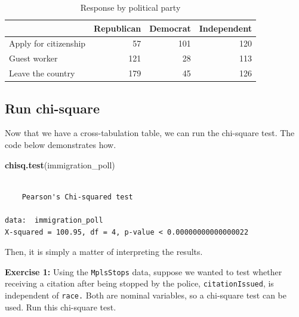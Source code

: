 \documentclass[
]{book}
\makeatletter
\newenvironment{Shaded}{\begin{snugshade}}{\end{snugshade}}
\newcommand{\FunctionTok}[1]{\textcolor[rgb]{0.27,0.27,0.27}{\textbf{#1}}}
\newcommand{\NormalTok}[1]{#1}
\newcommand{\OtherTok}[1]{\textcolor[rgb]{0.37,0.37,0.37}{#1}}
\newcommand{\SpecialCharTok}[1]{\textcolor[rgb]{0.43,0.43,0.43}{\textbf{#1}}}
\newenvironment{kframe}{%
\medskip{}
\setlength{\fboxsep}{.8em}
 \def\at@end@of@kframe{}%
 \ifinner\ifhmode%
  \def\at@end@of@kframe{\end{minipage}}%
  \begin{minipage}{\columnwidth}%
 \fi\fi%
 \def\FrameCommand##1{\hskip\@totalleftmargin \hskip-\fboxsep
 \colorbox{shadecolor}{##1}\hskip-\fboxsep
     \hskip-\linewidth \hskip-\@totalleftmargin \hskip\columnwidth}%
 \MakeFramed {\advance\hsize-\width
   \@totalleftmargin\z@ \linewidth\hsize
   \@setminipage}}%
 {\par\unskip\endMakeFramed%
 \at@end@of@kframe}
\renewenvironment{Shaded}{\begin{kframe}}{\end{kframe}}
\newenvironment{rmdblock}[1]
  {\begin{shaded*}
  }
  {\end{shaded*}
  }
\newenvironment{learncheck}
  {\begin{rmdblock}{warning}}
  {\end{rmdblock}}
\makeatother
\begin{document}
\begin{Shaded}
\end{Shaded}

\begin{table}

\caption{\label{tab:unnamed-chunk-193}Response by political party}
\centering
\begin{tabular}[t]{l|r|r|r}
\hline
  & Republican & Democrat & Independent\\
\hline
Apply for citizenship & 57 & 101 & 120\\
\hline
Guest worker & 121 & 28 & 113\\
\hline
Leave the country & 179 & 45 & 126\\
\hline
\end{tabular}
\end{table}

\hypertarget{run-chi-square}{%
\subsection{Run chi-square}\label{run-chi-square}}

Now that we have a cross-tabulation table, we can run the chi-square test. The code below demonstrates how.

\begin{Shaded}
\begin{Highlighting}[]
\FunctionTok{chisq.test}\NormalTok{(immigration\_poll)}
\end{Highlighting}
\end{Shaded}

\begin{verbatim}

    Pearson's Chi-squared test

data:  immigration_poll
X-squared = 100.95, df = 4, p-value < 0.00000000000000022
\end{verbatim}

Then, it is simply a matter of interpreting the results.

\begin{learncheck}
\textbf{Exercise 1:} Using the \texttt{MplsStops} data, suppose we
wanted to test whether receiving a citation after being stopped by the
police, \texttt{citationIssued}, is independent of \texttt{race.} Both
are nominal variables, so a chi-square test can be used. Run this
chi-square test.
\end{learncheck}
\end{document}

